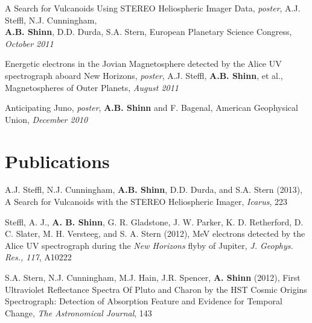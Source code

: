 \documentclass[margin,line]{res}
\newenvironment{list2}{
  \begin{list}{$\cdot$}{%
      \setlength{\itemsep}{0in}
      \setlength{\parsep}{0in} \setlength{\parskip}{0in}
      \setlength{\topsep}{0in} \setlength{\partopsep}{0in} 
      \setlength{\leftmargin}{0.2in}}}{\end{list}}
\begin{document}
\begin{resume}
A Search for Vulcanoids Using STEREO Heliospheric Imager Data, {\it poster}, A.J. Steffl, N.J. Cunningham, \\
{\bf A.B. Shinn}, D.D. Durda, S.A. Stern, European Planetary Science Congress, {\it October 2011}

Energetic electrons in the Jovian Magnetosphere detected by the Alice UV spectrograph aboard New Horizons, {\it poster}, A.J. Steffl, {\bf A.B. Shinn}, et al., Magnetospheres of Outer Planets, {\it August 2011}

Anticipating Juno, {\it poster}, {\bf A.B. Shinn} and F. Bagenal, American Geophysical Union, {\it December 2010}


\section{\sc Publications}

A.J. Steffl, N.J. Cunningham, {\bf A.B. Shinn}, D.D. Durda, and S.A. Stern (2013), A Search for Vulcanoids with the STEREO Heliospheric Imager, {\em Icarus}, 223

Steffl, A. J., {\bf A. B. Shinn}, G. R. Gladstone, J. W. Parker, K. D. Retherford, D. C. Slater, M. H. Versteeg, and S. A. Stern (2012), MeV electrons detected by the Alice UV spectrograph during the {\em New Horizons} flyby of Jupiter, {\em J. Geophys. Res., 117}, A10222%

S.A. Stern, N.J. Cunningham, M.J. Hain, J.R. Spencer, {\bf A. Shinn} (2012), First Ultraviolet Reflectance Spectra Of Pluto and Charon by the HST Cosmic Origins Spectrograph: Detection of Absorption Feature and Evidence for Temporal Change, {\em The Astronomical Journal}, 143


% 
% 



\end{resume}
\end{document}
